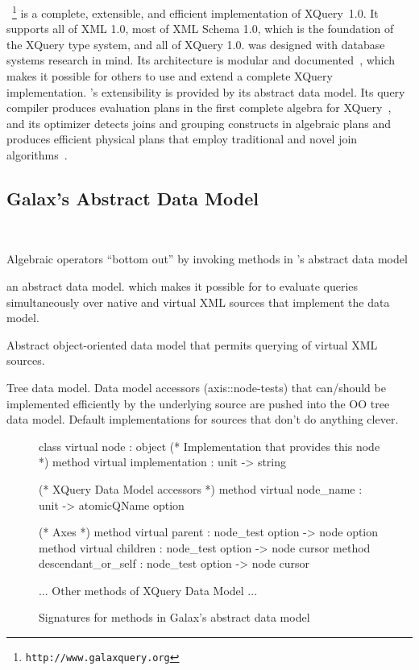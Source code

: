 \Galax{}~\footnote{\texttt{http://www.galaxquery.org}} is a complete,
extensible, and efficient implementation of XQuery~1.0.  It supports
all of XML 1.0, most of XML Schema 1.0, which is the foundation of the
XQuery type system, and all of XQuery 1.0.  \Galax{} was designed with
database systems research in mind.  Its architecture is modular and
documented~\cite{galax-edbt2004}, which makes it possible for others
to use and extend a complete XQuery implementation.  
\Galax{}'s extensibility is provided by its abstract data model.
Its query
compiler produces evaluation plans in the first complete algebra for
XQuery~\cite{galax-icde2006}, and its optimizer detects joins and
grouping constructs in algebraic plans and produces efficient physical
plans that employ traditional and novel join
algorithms~\cite{galax-icde2006}.

\subsection{Galax's Abstract Data Model}

~\cite{xquerydm}

Algebraic operators ``bottom out'' by invoking methods in 
\Galax{}'s abstract data model 


\Galax{}  an abstract data model.  which makes it possible for
\Galax{} to evaluate queries simultaneously over native and virtual
XML sources that implement the data model.   


Abstract object-oriented data model that permits querying of virtual
XML sources.  

Tree data model.  Data model accessors (axis::node-tests) that can/should be implemented
efficiently by the underlying source are pushed into the OO tree data
model.  Default implementations for sources that don't do anything
clever.   
\begin{figure*}
\begin{small}
\begin{code}
class virtual node : 
object
  (* Implementation that provides this node *)
  method virtual implementation : unit -> string

  (* XQuery Data Model accessors *)
  method virtual node_name  : unit -> atomicQName option

  (* Axes *)
  method virtual parent     : node_test option -> node option
  method virtual children   : node_test option -> node cursor
  method descendant_or_self : node_test option -> node cursor

  ... Other methods of XQuery Data Model ...

\end{code}
\end{small}
\caption{Signatures for methods in Galax's abstract data model}
\end{figure*}

